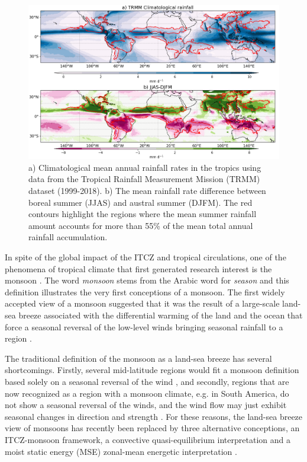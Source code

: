 \begin{figure}[t!]
\includegraphics[width=\linewidth]{figures/trmmclima.png}
\caption[The global monsoon rainfall]{a) Climatological mean annual rainfall rates in the tropics using data from the Tropical Rainfall Measurement Mission (TRMM) dataset (1999-2018). b) The mean rainfall rate difference between boreal summer (JJAS) and austral summer (DJFM). The red contours highlight the regions where the mean summer rainfall amount accounts for more than 55\% of the mean total annual rainfall accumulation. }
\label{fig:monsoon}
\end{figure}

In spite of the global impact of the ITCZ and tropical circulations, one of the phenomena of tropical climate that first generated research interest is the monsoon \citep{halley}. The word \textit{monsoon} stems from the Arabic word for \textit{season} and this definition illustrates the very first conceptions of a monsoon. 
The first widely accepted view of a monsoon suggested that it was the result of a large-scale land-sea breeze associated with the differential warming of the land and the ocean that force a seasonal reversal of the low-level winds bringing seasonal rainfall to a region \citep{halley}. 

The traditional definition of the monsoon as a land-sea breeze has several shortcomings. Firstly, several mid-latitude regions would fit a monsoon definition based solely on a seasonal reversal of the wind \citep{gadgil2018}, and secondly, regions that are now recognized as a region with a monsoon climate, e.g. in South America, do not show a seasonal reversal of the winds, and the wind flow may just exhibit seasonal changes in direction and strength \citep{vera2006}. For these reasons, the land-sea breeze view of monsoons has recently been replaced by three alternative conceptions, an ITCZ-monsoon framework, a convective quasi-equilibrium interpretation and a moist static energy (MSE) zonal-mean energetic interpretation \citep{biasutti2018global,hill2019,geen2020}. 



